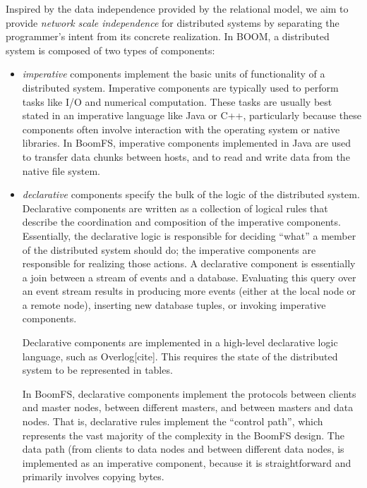 \documentclass{article}
\begin{document}
Inspired by the data independence provided by the relational model, we
aim to provide \emph{network scale independence} for distributed
systems by separating the programmer's intent from its concrete
realization. In BOOM, a distributed system is composed of two types of
components:
\begin{itemize}
\item
  \emph{imperative} components implement the basic units of
  functionality of a distributed system. Imperative components are
  typically used to perform tasks like I/O and numerical
  computation. These tasks are usually best stated in an imperative
  language like Java or C++, particularly because these components
  often involve interaction with the operating system or native
  libraries. In BoomFS, imperative components implemented in Java are
  used to transfer data chunks between hosts, and to read and write
  data from the native file system.

\item
  \emph{declarative} components specify the bulk of the logic of the
  distributed system. Declarative components are written as a
  collection of logical rules that describe the coordination and
  composition of the imperative components. Essentially, the
  declarative logic is responsible for deciding ``what'' a member of
  the distributed system should do; the imperative components are
  responsible for realizing those actions. A declarative component is
  essentially a join between a stream of events and a
  database. Evaluating this query over an event stream results in
  producing more events (either at the local node or a remote node),
  inserting new database tuples, or invoking imperative
  components.

  Declarative components are implemented in a high-level declarative
  logic language, such as Overlog[cite]. This requires the state of
  the distributed system to be represented in tables.

  In BoomFS, declarative components implement the protocols between
  clients and master nodes, between different masters, and between
  masters and data nodes. That is, declarative rules implement the
  ``control path'', which represents the vast majority of the
  complexity in the BoomFS design. The data path (from clients to data
  nodes and between different data nodes, is implemented as an
  imperative component, because it is straightforward and primarily
  involves copying bytes.
\end{itemize}
\end{document}
